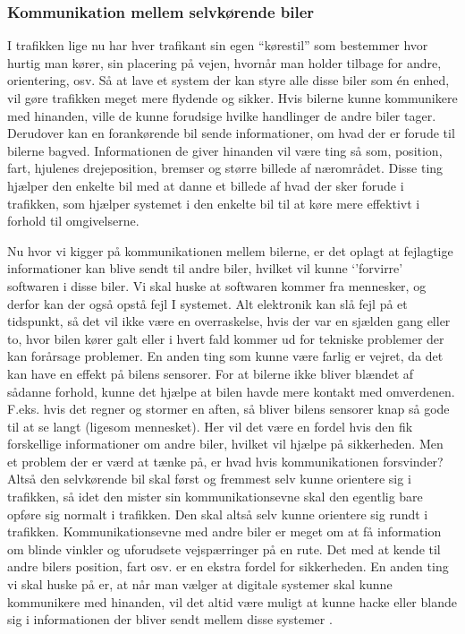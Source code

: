 
\subsubsection{Kommunikation mellem selvkørende biler}

I trafikken lige nu har hver trafikant sin egen ``kørestil'' som bestemmer hvor hurtig man kører, sin placering på vejen, hvornår man holder tilbage for andre, orientering, osv. Så at lave et system der kan styre alle disse biler som \'en enhed, vil gøre trafikken meget mere flydende og sikker. Hvis bilerne kunne kommunikere med hinanden, ville de kunne forudsige hvilke handlinger de andre biler tager. Derudover kan en forankørende bil sende informationer, om hvad der er forude til bilerne bagved. Informationen de giver hinanden vil være ting så som, position, fart, hjulenes drejeposition, bremser og større billede af nærområdet. Disse ting hjælper den enkelte bil med at danne et billede af hvad der sker forude i trafikken, som hjælper systemet i den enkelte bil til at køre mere effektivt i forhold til omgivelserne. 

Nu hvor vi kigger på kommunikationen mellem bilerne, er det oplagt at fejlagtige informationer kan blive sendt til andre biler, hvilket vil kunne `'forvirre' softwaren i disse biler. Vi skal huske at  softwaren kommer fra mennesker, og derfor kan der også opstå fejl I systemet. Alt elektronik kan slå fejl på et tidspunkt, så det vil ikke være en overraskelse, hvis der var en sjælden gang eller to, hvor bilen kører galt eller i hvert fald kommer ud for tekniske problemer der kan forårsage problemer. En anden ting som kunne være farlig er vejret, da det kan have en effekt på bilens sensorer. For at bilerne ikke bliver blændet af sådanne forhold, kunne det hjælpe at bilen havde mere kontakt med omverdenen. F.eks. hvis det regner og stormer en aften, så bliver bilens sensorer knap så gode til at se langt (ligesom mennesket). Her vil det være en fordel hvis den fik forskellige informationer om andre biler, hvilket vil hjælpe på sikkerheden. Men et problem der er værd at tænke på, er hvad hvis kommunikationen forsvinder? Altså den selvkørende bil skal først og fremmest selv kunne orientere sig i trafikken, så idet den mister sin kommunikationsevne skal den egentlig bare opføre sig normalt i trafikken. Den skal altså selv kunne orientere sig rundt i trafikken. Kommunikationsevne med andre biler er meget om at få information om blinde vinkler og uforudsete vejspærringer på en rute. Det med at kende til andre bilers position, fart osv. er en ekstra fordel for sikkerheden. En anden ting vi skal huske på er, at når man vælger at digitale systemer skal kunne kommunikere med hinanden, vil det altid være muligt at kunne hacke eller blande sig i informationen der bliver sendt mellem disse systemer \cite{car_to_car}.
